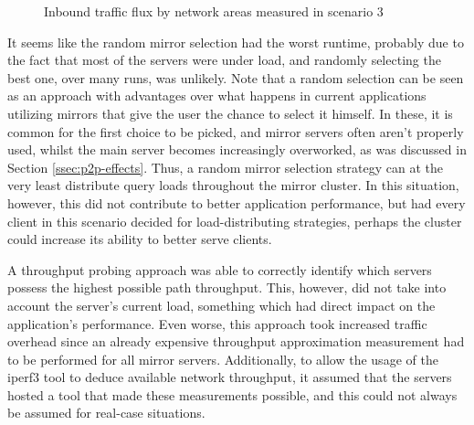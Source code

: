 \begin{figure}[H]
\caption{Inbound traffic flux by network areas measured in scenario 3}
\label{fig:graph-traffic-scenario3}
\end{figure}

    It seems like the random mirror selection had the worst runtime, probably due to the fact that most of the servers were under load, and randomly selecting the best one, over many runs, was unlikely.
    Note that a random selection can be seen as an approach with advantages over what happens in current applications utilizing mirrors that give the user the chance to select it himself.
    In these, it is common for the first choice to be picked, and mirror servers often aren't properly used, whilst the main server becomes increasingly overworked, as was discussed in Section \ref{ssec:p2p-effects}.
    Thus, a random mirror selection strategy can at the very least distribute query loads throughout the mirror cluster.
    In this situation, however, this did not contribute to better application performance, but had every client in this scenario decided for load-distributing strategies, perhaps the cluster could increase its ability to better serve clients.

    A throughput probing approach was able to correctly identify which servers possess the highest possible path throughput.
    This, however, did not take into account the server's current load, something which had direct impact on the application's performance.
    Even worse, this approach took increased traffic overhead since an already expensive throughput approximation measurement had to be performed for all mirror servers.
    Additionally, to allow the usage of the iperf3 tool to deduce available network throughput, it assumed that the servers hosted a tool that made these measurements possible, and this could not always be assumed for real-case situations.

